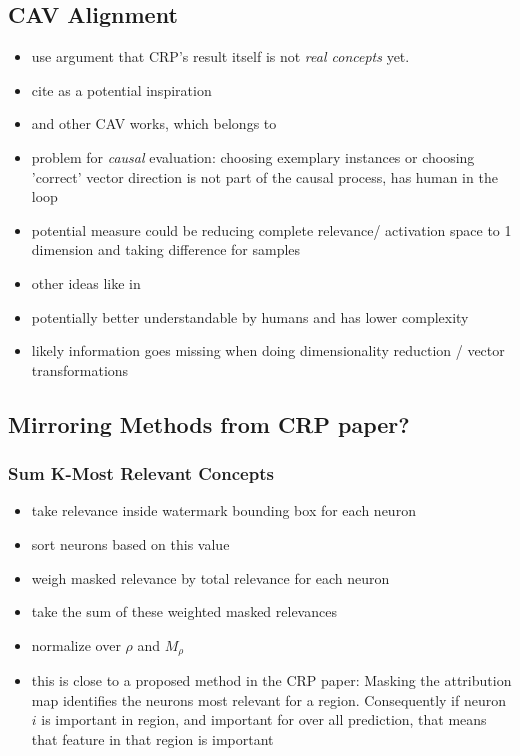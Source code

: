 \subsection{CAV Alignment}
\begin{itemize}
    \item use argument that CRP's result itself is not \textit{real concepts} yet. 
    \item cite \cite{Dreyer2023a} as a potential inspiration
    \item and other CAV works, which \cite{Kim2018} belongs to
    \item problem for \textit{causal} evaluation: choosing exemplary instances or choosing 'correct' vector direction is not part of the causal process, has human in the loop
    \item potential measure could be reducing complete relevance/ activation space to 1 dimension and taking difference for samples
    \item other ideas like in \cite{Chormai2022,Leemann2023,Ghorbani2019,Zhang2021}
    \item potentially better understandable by humans and has lower complexity
    \item likely information goes missing when doing dimensionality reduction / vector transformations
\end{itemize}

\subsection{Mirroring Methods from CRP paper?}
\subsubsection{Sum K-Most Relevant Concepts}
\begin{itemize}
    \item take relevance inside watermark bounding box for each neuron
    \item sort neurons based on this value
    \item weigh masked relevance by total relevance for each neuron
    \item take the sum of these weighted masked relevances
    \item normalize over $\rho$ and $M_{\rho}$
    \item this is close to a proposed method in the CRP paper: Masking the attribution map identifies the neurons most relevant for a region. Consequently if neuron $i$ is important in region, and important for over all prediction, that means that feature in that region is important
\end{itemize}

